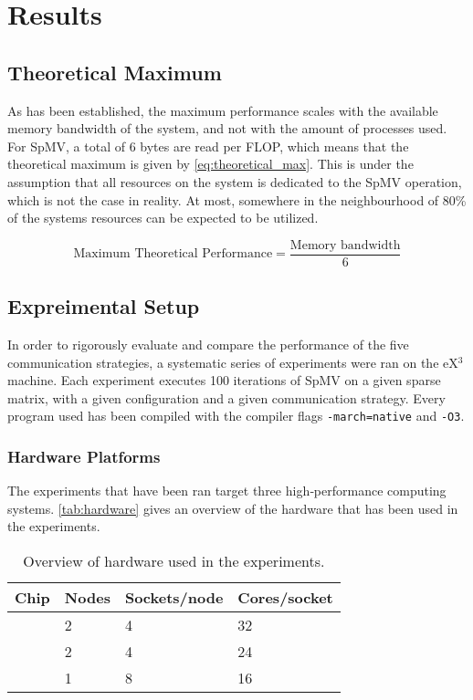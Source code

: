 \chapter{Results} \label{results}

\section{Theoretical Maximum}
As has been established, the maximum performance scales with the available memory bandwidth of the system, and not with the amount of processes used. For SpMV, a total of 6 bytes are read per FLOP, which means that the theoretical maximum is given by \ref{eq:theoretical_max}. This is under the assumption that all resources on the system is dedicated to the SpMV operation, which is not the case in reality. At most, somewhere in the neighbourhood of 80\% of the systems resources can be expected to be utilized.

\begin{equation}
\text{Maximum Theoretical Performance} = \frac{\text{Memory bandwidth}}{6}
\label{eq:theoretical_max}
\end{equation}


\section{Expreimental Setup}
In order to rigorously evaluate and compare the performance of the five communication strategies, a systematic series of experiments were ran on the eX\(^{3}\) machine. Each experiment executes 100 iterations of SpMV on a given sparse matrix, with a given configuration and a given communication strategy. Every program used has been compiled with the compiler flags \texttt{-march=native} and \texttt{-O3}.
 
\subsection{Hardware Platforms}

The experiments that have been ran target three high‐performance computing systems. \autoref{tab:hardware} gives an overview of the hardware that has been used in the experiments.

\begin{table}[H]
    \begin{center}
        \begin{tabular}[c]{|l|l|l|l|}
            \hline
            \textbf{Chip}&\textbf{Nodes}&\textbf{Sockets/node}&\textbf{Cores/socket}  \\
            \hline
            {}&2&4&32  \\
            \hline
            \fpgaq{}&2&4&24  \\
            \hline
            \romeq{}&1&8&16  \\
            \hline
        \end{tabular}
    \end{center}
    \caption{Overview of hardware used in the experiments.}
    \label{tab:hardware}
\end{table}


